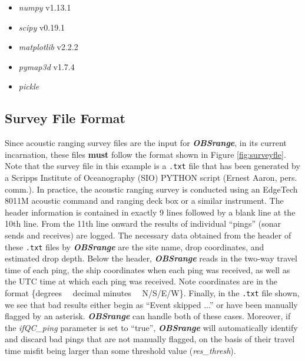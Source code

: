 \documentclass[titlepage, 12pt]{article}
\begin{document}
  \begin{itemize}
   \item \textit{numpy} v1.13.1
   \item \textit{scipy} v0.19.1
   \item \textit{matplotlib} v2.2.2
   \item \textit{pymap3d} v1.7.4
   \item \textit{pickle}
  \end{itemize}

  \subsection{Survey File Format}
  Since acoustic ranging survey files are the input for \textit{\textbf{OBSrange}}, in its current incarnation, these files \textbf{must} follow the format shown in Figure \ref{fig:surveyfle}. Note that the survey file in this example is a \texttt{.txt} file that has been generated by a Scripps Institute of Oceanography (SIO) PYTHON script (Ernest Aaron, pers. comm.). In practice, the acoustic ranging survey is conducted using an EdgeTech 8011M acoustic command and ranging deck box or a similar instrument. The header information is contained in exactly 9 lines followed by a blank line at the 10th line. From the 11th line onward the results of individual ``pings'' (sonar sends and receives) are logged. The necessary data obtained from the header of these \texttt{.txt} files by \textit{\textbf{OBSrange}} are the site name, drop coordinates, and estimated drop depth. Below the header, \textit{\textbf{OBSrange}} reads in the two-way travel time of each ping, the ship coordinates when each ping was received, as well as the UTC time at which each ping was received. Note coordinates are in the format \{degrees~~ decimal minutes~~ N/S/E/W\}. Finally, in the \texttt{.txt} file shown, we see that bad results either begin as ``Event skipped ...'' or have been manually flagged by an asterisk. \textit{\textbf{OBSrange}} can handle both of these cases. Moreover, if the \textit{ifQC\_ping} parameter is set to ``true'', \textit{\textbf{OBSrange}} will automatically identify and discard bad pings that are not manually flagged, on the basis of their travel time misfit being larger than some threshold value (\textit{res\_thresh}). 
\end{document}
